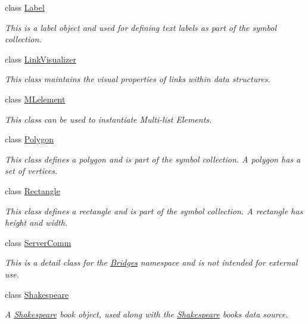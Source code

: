 \begin{DoxyCompactItemize}
class \mbox{\hyperlink{classbridges_1_1_label}{Label}}
\begin{DoxyCompactList}\small\item\em This is a label object and used for defining text labels as part of the symbol collection. \end{DoxyCompactList}\item 
class \mbox{\hyperlink{classbridges_1_1_link_visualizer}{Link\+Visualizer}}
\begin{DoxyCompactList}\small\item\em This class maintains the visual properties of links within data structures. \end{DoxyCompactList}\item 
class \mbox{\hyperlink{classbridges_1_1_m_lelement}{M\+Lelement}}
\begin{DoxyCompactList}\small\item\em This class can be used to instantiate Multi-\/list Elements. \end{DoxyCompactList}\item 
class \mbox{\hyperlink{classbridges_1_1_polygon}{Polygon}}
\begin{DoxyCompactList}\small\item\em This class defines a polygon and is part of the symbol collection. A polygon has a set of vertices. \end{DoxyCompactList}\item 
class \mbox{\hyperlink{classbridges_1_1_rectangle}{Rectangle}}
\begin{DoxyCompactList}\small\item\em This class defines a rectangle and is part of the symbol collection. A rectangle has height and width. \end{DoxyCompactList}\item 
class \mbox{\hyperlink{classbridges_1_1_server_comm}{Server\+Comm}}
\begin{DoxyCompactList}\small\item\em This is a detail class for the \mbox{\hyperlink{classbridges_1_1_bridges}{Bridges}} namespace and is not intended for external use. \end{DoxyCompactList}\item 
class \mbox{\hyperlink{classbridges_1_1_shakespeare}{Shakespeare}}
\begin{DoxyCompactList}\small\item\em A \mbox{\hyperlink{classbridges_1_1_shakespeare}{Shakespeare}} book object, used along with the \mbox{\hyperlink{classbridges_1_1_shakespeare}{Shakespeare}} books data source. \end{DoxyCompactList}\item 

\end{DoxyCompactItemize}
